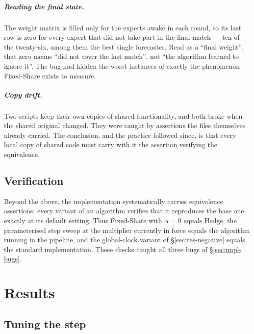 \documentclass[12pt,a4paper,oneside]{report}
\renewcommand{\_}{\oldunderscore\allowbreak}
\theoremstyle{definition}
\theoremstyle{plain}
\theoremstyle{remark}
\begin{document}
\paragraph{Reading the final state.} The weight matrix is filled only for the experts awake in
each round, so its last row is zero for every expert that did not take part in the final match
--- ten of the twenty-six, among them the best single forecaster. Read as a ``final weight'',
that zero means ``did not cover the last match'', not ``the algorithm learned to ignore it''. The
bug had hidden the worst instances of exactly the phenomenon Fixed-Share exists to measure.

\paragraph{Copy drift.} Two scripts keep their own copies of shared functionality, and both broke
when the shared original changed. They were caught by assertions the files themselves already
carried. The conclusion, and the practice followed since, is that every local copy of shared code
must carry with it the assertion verifying the equivalence.

\section{Verification}

Beyond the above, the implementation systematically carries equivalence assertions: every variant
of an algorithm verifies that it reproduces the base one exactly at its default setting. Thus
Fixed-Share with $\alpha=0$ equals Hedge, the parameterised step sweep at the multiplier currently
in force equals the algorithm running in the pipeline, and the global-clock variant of
\S\ref{sec:res-negative} equals the standard implementation. These checks caught all three bugs of
\S\ref{sec:impl-bugs}.

\chapter{Results}
\label{ch:results}

\section{Tuning the step}
\label{sec:res-steps}
\end{document}
